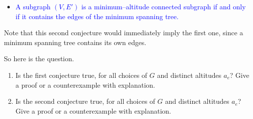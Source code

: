 \documentclass[11pt]{article}
\theoremstyle{numberplain}
\theoremstyle{nonumberplain}
\newcommand{\0}{{\mathbf{0}}}
\begin{document}
\begin{ques}[HW2,4-20]
\begin{itemize}
\item \textcolor{blue}{ 
A subgraph $(V,E')$ is a minimum--altitude connected subgraph if and only if it contains the edges of the minimum spanning tree.
}
\end{itemize}
Note that this second conjecture would immediately imply the first one, since a minimum spanning tree contains its own edges.\par
So here is the question.
\begin{enumerate}
\item Is the first conjecture true, for all choices of $G$ and distinct altitudes $a_e$? Give a proof or a counterexample with explanation.
\item Is the second conjecture true, for all choices of $G$ and distinct altitudes $a_e$? Give a proof or a counterexample with explanation. 
\end{enumerate}
\end{ques}
\end{document}

